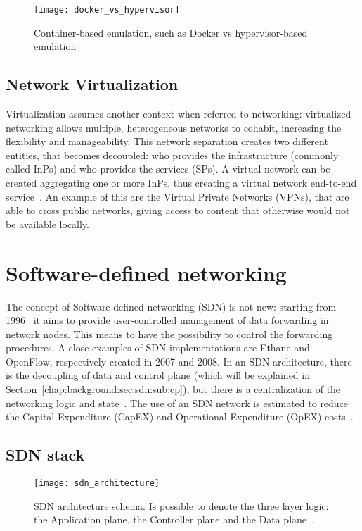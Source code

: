 \begin{figure}[t]
  \centering
  \texttt{[image: docker\_vs\_hypervisor]}
  \caption[Container-based emulation vs hypervisor emulation]{Container-based
    emulation, such as Docker vs hypervisor-based emulation~\cite{hung2016guidock}}
\end{figure}

\subsection{Network Virtualization}

Virtualization assumes another context when referred to networking: virtualized
networking allows multiple, heterogeneous networks to cohabit, increasing the
flexibility and manageability. This network separation creates two different
entities, that becomes decoupled: who provides the infrastructure (commonly
called InPs) and who provides the services (SPs). A virtual network can be
created aggregating one or more InPs, thus creating a virtual network end-to-end
service~\cite{chowdhury2009network}. An example of this are the Virtual Private
Networks (VPNs), that are able to cross public networks, giving access to
content that otherwise would not be available locally.

\section{Software-defined networking}
The concept of Software-defined networking (SDN) is not new: starting from
1996~\cite{sezer2013we} it aims to provide user-controlled management of data
forwarding in network nodes. This means to have the possibility to control the
forwarding procedures. A close examples of SDN implementations are Ethane and
OpenFlow, respectively created in 2007 and 2008. In an SDN architecture, there
is the decoupling of data and control plane (which will be explained in
Section~\ref{chap:background:sec:sdn:sub:cp}), but there is a centralization of
the networking logic and state~\cite{fundation2012software}. The use of an SDN
network is estimated to reduce the Capital Expenditure (CapEX) and Operational
Expenditure (OpEX) costs~\cite{benzekki2016software}.

\subsection{SDN stack}
\begin{figure}[ht]
 \centering
 \texttt{[image: sdn\_architecture]}
 \caption[SDN architecture schema]{SDN architecture schema. Is possible to 
denote the three layer logic: the Application plane, the Controller plane and 
the Data plane~\cite{fundation2013software}.}
 \label{chap:background:img:sdn_architecture}
\end{figure}

